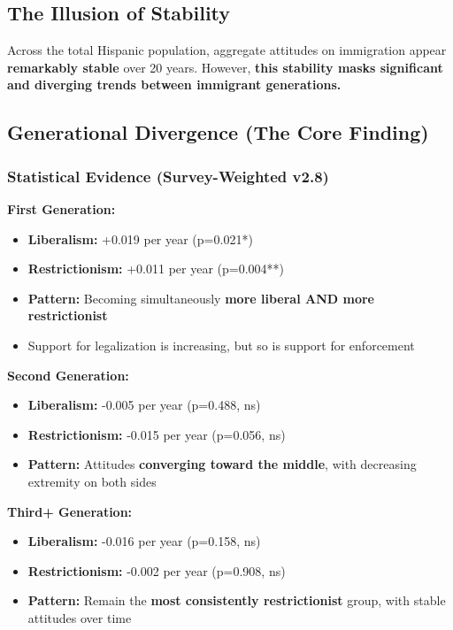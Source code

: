 \documentclass[11pt,letterpaper]{article}
\begin{document}
\subsection{The Illusion of Stability}
Across the total Hispanic population, aggregate attitudes on immigration appear \textbf{remarkably stable} over 20 years. However, \textbf{this stability masks significant and diverging trends between immigrant generations.}

\subsection{Generational Divergence (The Core Finding)}

\subsubsection{Statistical Evidence (Survey-Weighted v2.8)}

\textbf{First Generation:}
\begin{itemize}
    \item \textbf{Liberalism:} +0.019 per year (p=0.021*)
    \item \textbf{Restrictionism:} +0.011 per year (p=0.004**)
    \item \textbf{Pattern:} Becoming simultaneously \textbf{more liberal AND more restrictionist}
    \item Support for legalization is increasing, but so is support for enforcement
\end{itemize}

\textbf{Second Generation:}
\begin{itemize}
    \item \textbf{Liberalism:} -0.005 per year (p=0.488, ns)
    \item \textbf{Restrictionism:} -0.015 per year (p=0.056, ns)
    \item \textbf{Pattern:} Attitudes \textbf{converging toward the middle}, with decreasing extremity on both sides
\end{itemize}

\textbf{Third+ Generation:}
\begin{itemize}
    \item \textbf{Liberalism:} -0.016 per year (p=0.158, ns)
    \item \textbf{Restrictionism:} -0.002 per year (p=0.908, ns)
    \item \textbf{Pattern:} Remain the \textbf{most consistently restrictionist} group, with stable attitudes over time
\end{itemize}
\end{document}
